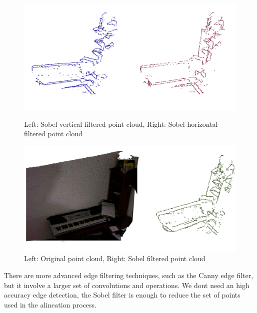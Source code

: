 \begin{figure}[h!]
\begin{center}
\includegraphics[scale=0.35]{images/sobel_v_h.png}
\caption{Left: Sobel vertical filtered point cloud, Right: Sobel horizontal filtered point cloud}
\end{center}

\begin{center}
\includegraphics[scale=0.35]{images/sobel_o_g.png}
\caption{Left: Original point cloud, Right: Sobel filtered point cloud}
\end{center}
\end{figure}

There are more advanced edge filtering techniques, such as the Canny edge filter, but it involve 
a larger set of convolutions and operations. We dont need an high accuracy edge detection, the Sobel 
filter is enough to reduce the set of points used in the alineation process.
